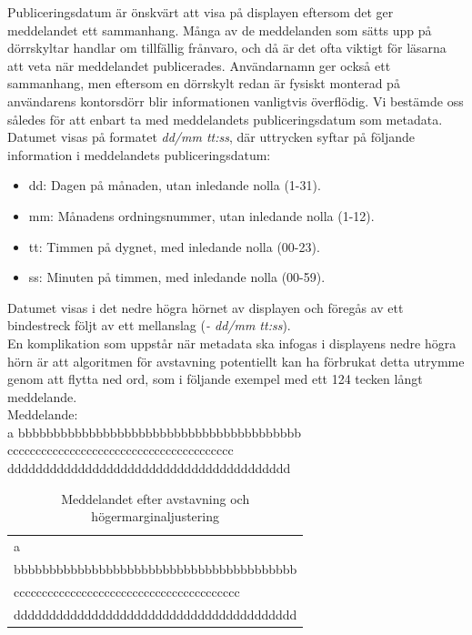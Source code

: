 \documentclass[a4paper,11pt]{article}
\begin{document}
Publiceringsdatum är önskvärt att visa på displayen eftersom det ger meddelandet ett sammanhang. Många av de meddelanden som sätts upp på dörrskyltar handlar om tillfällig frånvaro, och då är det ofta viktigt för läsarna att veta när meddelandet publicerades. Användarnamn ger också ett sammanhang, men eftersom en dörrskylt redan är fysiskt monterad på användarens kontorsdörr blir informationen vanligtvis överflödig. Vi bestämde oss således för att enbart ta med meddelandets publiceringsdatum som metadata.\\

Datumet visas på formatet {\it dd/mm tt:ss}, där uttrycken syftar på följande information i meddelandets publiceringsdatum:

	\begin{itemize}
    	\item dd: Dagen på månaden, utan inledande nolla (1-31).
    	\item mm: Månadens ordningsnummer, utan inledande nolla (1-12).
    	\item tt: Timmen på dygnet, med inledande nolla (00-23).
    	\item ss: Minuten på timmen, med inledande nolla (00-59).
    	\end{itemize}
    	
Datumet visas i det nedre högra hörnet av displayen och föregås av ett bindestreck följt av ett mellanslag ({\it - dd/mm tt:ss}).\\

En komplikation som uppstår när metadata ska infogas i displayens nedre högra hörn är att algoritmen för avstavning potentiellt kan ha förbrukat detta utrymme genom att flytta ned ord, som i följande exempel med ett 124 tecken långt meddelande. \\

Meddelande:\\

a bbbbbbbbbbbbbbbbbbbbbbbbbbbbbbbbbbbbbbbb cccccccccccccccccccccccccccccccccccccccc dddddddddddddddddddddddddddddddddddddddd

\begin{table}[h]
\centering
	\begin{tabular}{l|}
	a \\
	bbbbbbbbbbbbbbbbbbbbbbbbbbbbbbbbbbbbbbbb \\
	cccccccccccccccccccccccccccccccccccccccc \\
	dddddddddddddddddddddddddddddddddddddddd \\
	\end{tabular}
\caption{Meddelandet efter avstavning och högermarginaljustering}
\label{tab:msgexample}
\end{table}
\end{document}
